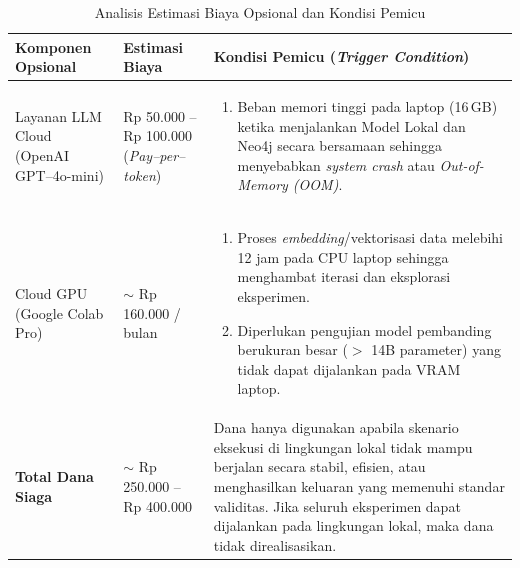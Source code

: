 \renewcommand{\arraystretch}{1.2}
\captionsetup{justification=raggedright,singlelinecheck=false}
\begin{table}[H]
\centering
\caption{Analisis Estimasi Biaya Opsional dan Kondisi Pemicu}
\label{tbl:cost_analysis}
\begin{tabular}{|p{3cm}|p{3cm}|p{7cm}|}
\hline
\textbf{Komponen Opsional} &
\textbf{Estimasi Biaya} &
\textbf{Kondisi Pemicu (\textit{Trigger Condition})} \\ \hline

Layanan LLM Cloud (OpenAI GPT--4o-mini) &
Rp 50.000 -- Rp 100.000 \newline 
(\textit{Pay--per--token}) &
\begin{enumerate}[leftmargin=0.5cm]
    \item Beban memori tinggi pada laptop (16\,GB) ketika menjalankan Model Lokal 
    dan Neo4j secara bersamaan sehingga menyebabkan \textit{system crash} atau 
    \textit{Out-of-Memory (OOM)}. 
\end{enumerate} \\ \hline

Cloud GPU (Google Colab Pro) &
\(\sim\) Rp 160.000 / bulan &
\begin{enumerate}[leftmargin=0.5cm]
    \item Proses \textit{embedding}/vektorisasi data melebihi 12 jam pada CPU laptop 
    sehingga menghambat iterasi dan eksplorasi eksperimen.
    \item Diperlukan pengujian model pembanding berukuran besar 
    ($>$ 14B parameter) yang tidak dapat dijalankan pada VRAM laptop.
\end{enumerate} \\ \hline

\textbf{Total Dana Siaga} &
\(\sim\) Rp 250.000 -- Rp 400.000 &
Dana hanya digunakan apabila skenario eksekusi di lingkungan lokal tidak mampu berjalan 
secara stabil, efisien, atau menghasilkan keluaran yang memenuhi standar validitas. 
Jika seluruh eksperimen dapat dijalankan pada lingkungan lokal, 
maka dana tidak direalisasikan. \\ \hline

\end{tabular}
\end{table}